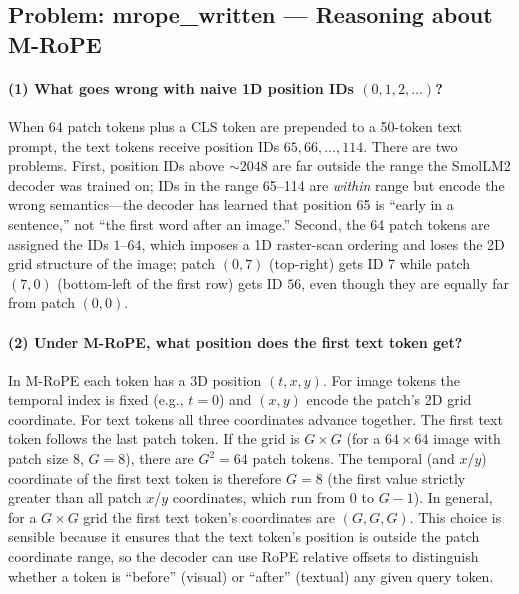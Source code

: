 \documentclass[11pt]{article}
\begin{document}
\subsection*{Problem: mrope\_written --- Reasoning about M-RoPE}

\paragraph{(1) What goes wrong with naive 1D position IDs $(0,1,2,\ldots)$?}
When 64 patch tokens plus a CLS token are prepended to a 50-token text
prompt, the text tokens receive position IDs $65, 66, \ldots, 114$.  There
are two problems.  First, position IDs above ${\sim}2048$ are far outside the
range the SmolLM2 decoder was trained on; IDs in the range 65--114 are
\emph{within} range but encode the wrong semantics---the decoder has learned
that position 65 is ``early in a sentence,'' not ``the first word after an
image.''  Second, the 64 patch tokens are assigned the IDs $1$--$64$, which
imposes a 1D raster-scan ordering and loses the 2D grid structure of the
image; patch $(0, 7)$ (top-right) gets ID 7 while patch $(7, 0)$
(bottom-left of the first row) gets ID $56$, even though they are equally
far from patch $(0, 0)$.

\paragraph{(2) Under M-RoPE, what position does the first text token get?}
In M-RoPE each token has a 3D position $(t, x, y)$.  For image tokens the
temporal index is fixed (e.g., $t = 0$) and $(x, y)$ encode the patch's
2D grid coordinate.  For text tokens all three coordinates advance together.
The first text token follows the last patch token.  If the grid is
$G \times G$ (for a $64\times64$ image with patch size 8, $G = 8$), there
are $G^2 = 64$ patch tokens.  The temporal (and $x$/$y$) coordinate of
the first text token is therefore $G = 8$ (the first value strictly greater
than all patch $x$/$y$ coordinates, which run from 0 to $G-1$).  In
general, for a $G\times G$ grid the first text token's coordinates are
$(G, G, G)$.  This choice is sensible because it ensures that the text
token's position is outside the patch coordinate range, so the decoder can
use RoPE relative offsets to distinguish whether a token is ``before''
(visual) or ``after'' (textual) any given query token.
\end{document}
